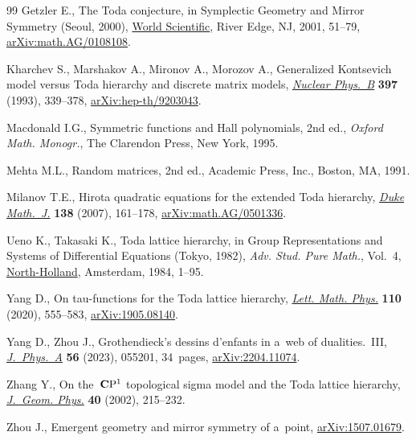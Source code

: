 \documentclass[11pt]{article}
\numberwithin{equation}{section}
\numberwithin{equation}{section}
\begin{document}
\begin{thebibliography}{99}
Getzler E., The {T}oda conjecture, in Symplectic Geometry and Mirror Symmetry
 ({S}eoul, 2000), \href{https://doi.org/10.1142/9789812799821_0003}{World
 Scientific}, River Edge, NJ, 2001, 51--79,
 \href{http://arxiv.org/abs/math.AG/0108108}{arXiv:math.AG/0108108}.

Kharchev S., Marshakov A., Mironov A., Morozov A., Generalized {K}ontsevich
 model versus {T}oda hierarchy and discrete matrix models,
 \href{https://doi.org/10.1016/0550-3213(93)90347-R}{\textit{Nuclear Phys.~B}}
 \textbf{397} (1993), 339--378,
 \href{http://arxiv.org/abs/hep-th/9203043}{arXiv:hep-th/9203043}.

Macdonald I.G., Symmetric functions and {H}all polynomials, 2nd ed., \textit{Oxford Math. Monogr.}, The Clarendon Press, New York, 1995.

Mehta M.L., Random matrices, 2nd ed., Academic Press, Inc., Boston, MA, 1991.

Milanov T.E., Hirota quadratic equations for the extended {T}oda hierarchy,
 \href{https://doi.org/10.1215/S0012-7094-07-13815-8}{\textit{Duke Math.~J.}}
 \textbf{138} (2007), 161--178,
 \href{http://arxiv.org/abs/math.AG/0501336}{arXiv:math.AG/0501336}.

Ueno K., Takasaki K., Toda lattice hierarchy, in Group Representations and
 Systems of Differential Equations ({T}okyo, 1982), \textit{Adv. Stud. Pure
 Math.}, Vol.~4, \href{https://doi.org/10.2969/aspm/00410001}{North-Holland},
 Amsterdam, 1984, 1--95.

Yang D., On tau-functions for the {T}oda lattice hierarchy,
 \href{https://doi.org/10.1007/s11005-019-01232-5}{\textit{Lett. Math. Phys.}}
 \textbf{110} (2020), 555--583,
 \href{http://arxiv.org/abs/1905.08140}{arXiv:1905.08140}.

Yang D., Zhou J., Grothendieck's dessins d'enfants in a~web of
 dualities.~{III},
 \href{https://doi.org/10.1088/1751-8121/acb744}{\textit{J.~Phys.~A}}
 \textbf{56} (2023), 055201, 34~pages,
 \href{http://arxiv.org/abs/2204.11074}{arXiv:2204.11074}.

Zhang Y., On the~{${\bf C}{\rm P}^1$} topological sigma model and the {T}oda
 lattice hierarchy,
 \href{https://doi.org/10.1016/S0393-0440(01)00036-5}{\textit{J.~Geom. Phys.}}
 \textbf{40} (2002), 215--232.

Zhou J., Emergent geometry and mirror symmetry of a~point,
 \href{http://arxiv.org/abs/1507.01679}{arXiv:1507.01679}.

\end{thebibliography}
\end{document}
